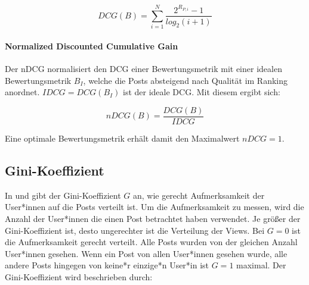 \begin{equation}
\label{dcg}
DCG(B) = \sum_{i = 1}^{N}\frac{2^{R_{P,i}}-1}{log_2(i + 1)}
\end{equation} 

\paragraph{Normalized Discounted Cumulative Gain}

Der nDCG normalisiert den DCG einer Bewertungsmetrik mit einer idealen Bewertungsmetrik $B_I$, welche die Posts absteigend nach Qualität im Ranking anordnet. $IDCG = DCG(B_I)$ ist der ideale DCG. Mit diesem ergibt sich:

\begin{equation}
\label{ndcg}
nDCG(B) = \frac{DCG(B)}{IDCG} 
\end{equation}

Eine optimale Bewertungsmetrik erhält damit den Maximalwert $nDCG = 1$.







\subsection{Gini-Koeffizient}

In \cite{Lerman2014} und \cite{Salganik2006854} gibt der Gini-Koeffizient $G$ an, wie gerecht Aufmerksamkeit der User*innen auf die Posts verteilt ist.
Um die Aufmerksamkeit zu messen, wird die Anzahl der User*innen die einen Post betrachtet haben verwendet. Je größer der Gini-Koeffizient ist, desto ungerechter ist die Verteilung der Views. 
Bei $G = 0$ ist die Aufmerksamkeit gerecht verteilt. Alle Posts wurden von der gleichen Anzahl User*innen gesehen. Wenn ein Post von allen User*innen gesehen wurde, alle andere Posts hingegen von keine*r einzige*n User*in ist $G = 1$ maximal. Der Gini-Koeffizient wird beschrieben durch:

